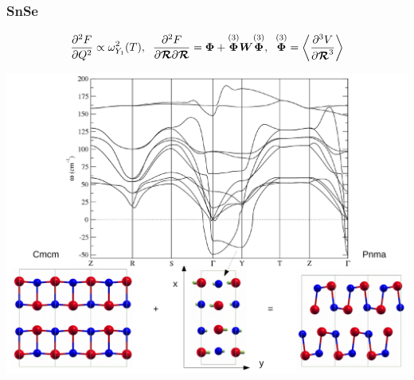\documentclass{beamer}
\begin{document}
\begin{frame}

\frametitle{SnSe}
\begin{equation}
  \frac{\partial^{2}F}{\partial Q^{2}}\propto\omega_{Y_{1}}^{2}(T), \hspace{0.2cm} \frac{\partial^{2}F}{\partial\boldsymbol{\mathcal{
  R}}\partial\boldsymbol{\mathcal{R}}}=\boldsymbol{\Phi}+\overset{(3)}{\boldsymbol{\Phi}}\boldsymbol{W}\overset{(3)}{\boldsymbol{\Phi}},
  \hspace{0.2cm} \overset{(3)}{\boldsymbol{\Phi}}=\left\langle\frac{\partial^{3}V}{\partial\boldsymbol{\mathcal{R}}^{3}}\right\rangle
 \nonumber
 \end{equation}
\begin{center}
  \includegraphics[width=0.7\linewidth]{Pictures/SnSe/figure3.pdf}
\end{center}

\end{frame}

\end{document}
